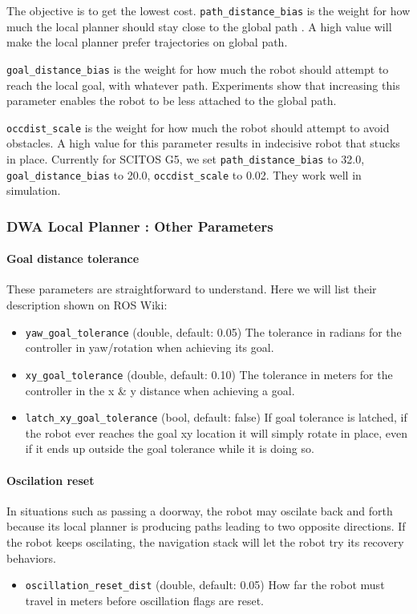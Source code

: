 \documentclass[12pt]{article}
\begin{document}
\normalsize
\noindent The objective is to get the lowest cost. \texttt{path\_distance\_bias} is the weight for how much the local planner should stay close to the global path \cite{furrer2016robot}. A high value will make the local planner prefer trajectories
on global path. 

\texttt{goal\_distance\_bias} is the weight for how much the robot should attempt to reach the local goal, with whatever path. Experiments show that increasing this
parameter enables the robot to be less attached to the global path.

\texttt{occdist\_scale} is the weight for how much the robot should attempt to avoid obstacles. A high value for this
parameter results in indecisive robot that stucks in place. Currently for SCITOS G5, we set \texttt{path\_distance\_bias} to 32.0, \texttt{goal\_distance\_bias} to 20.0, \texttt{occdist\_scale} to 0.02. They work well in simulation.

\newpage
\subsubsection{DWA Local Planner : Other Parameters}

\paragraph{Goal distance tolerance} These parameters are straightforward to understand. Here we will list their description shown on ROS Wiki:

\begin{itemize}
    \item \texttt{yaw\_goal\_tolerance} (double, default: 0.05)
    The tolerance in radians for the controller in yaw/rotation when achieving its goal.
    \item \texttt{xy\_goal\_tolerance} (double, default: 0.10)
    The tolerance in meters for the controller in the x \& y distance when achieving a goal.
    \item \texttt{latch\_xy\_goal\_tolerance} (bool, default: false) If goal tolerance is latched, if the robot ever reaches the goal xy location it will simply rotate in place, even if it ends up outside the goal tolerance while it is doing so.
\end{itemize}
    
\paragraph{Oscilation reset} In situations such as passing a doorway, the robot may oscilate back and forth because its local planner is producing paths leading to two opposite directions. If the robot keeps oscilating, the navigation stack will let the robot try its recovery behaviors.
\begin{itemize}
    \item \texttt{oscillation\_reset\_dist} (double, default: 0.05) How far the robot must travel in meters before oscillation flags are reset.
\end{itemize}
\end{document}
